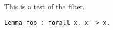 \documentclass[11pt]{article}
\begin{document}
This is a test of the filter.

\begin{verbatim}
Lemma foo : forall x, x -> x.
\end{verbatim}
\end{document}
